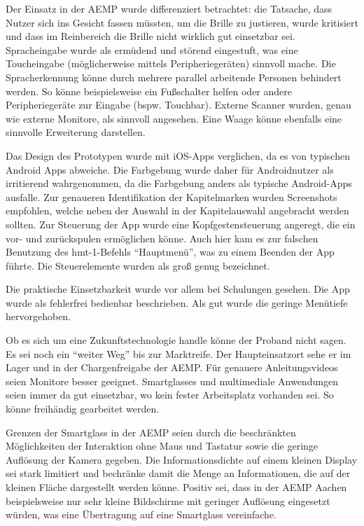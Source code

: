 Der Einsatz in der AEMP wurde differenziert betrachtet: die Tatsache, dass Nutzer sich ins Gesicht fassen müssten, um die Brille zu justieren, wurde kritisiert und dass im Reinbereich die Brille nicht wirklich gut einsetzbar sei. Spracheingabe wurde als ermüdend und störend eingestuft, was eine Toucheingabe (möglicherweise mittels Peripheriegeräten) sinnvoll mache. 
Die Spracherkennung könne durch mehrere parallel arbeitende Personen behindert werden. So könne beispielsweise ein Fußschalter helfen oder andere Peripheriegeräte zur Eingabe (bspw. Touchbar). Externe Scanner wurden, genau wie externe Monitore, als sinnvoll angesehen. Eine Waage könne ebenfalls eine sinnvolle Erweiterung darstellen.

Das Design des Prototypen wurde mit iOS-Apps verglichen, da es von typischen Android Apps abweiche. Die Farbgebung wurde daher für Androidnutzer als irritierend wahrgenommen, da die Farbgebung anders als typische Android-Apps ausfalle. Zur genaueren Identifikation der Kapitelmarken wurden Screenshots empfohlen, welche neben der Auswahl in der Kapitelauswahl angebracht werden sollten. Zur Steuerung der App wurde eine Kopfgestensteuerung angeregt, die ein vor- und zurückspulen ermöglichen könne. Auch hier kam es zur falschen Benutzung des hmt-1-Befehls \enquote{Hauptmenü}, was zu einem Beenden der App führte. Die Steuerelemente wurden als groß genug bezeichnet.

Die praktische Einsetzbarkeit wurde vor allem bei Schulungen gesehen. Die App wurde als fehlerfrei bedienbar beschrieben. Als gut wurde die geringe Menütiefe hervorgehoben.

Ob es sich um eine Zukunftstechnologie handle könne der Proband nicht sagen. Es sei noch ein \enquote{weiter Weg} bis zur Marktreife. Der Haupteinsatzort sehe er im Lager und in der Chargenfreigabe der AEMP. Für genauere Anleitungsvideos seien Monitore besser geeignet. Smartglasses und multimediale Anwendungen seien immer da gut einsetzbar, wo kein fester Arbeitsplatz vorhanden sei. So könne freihändig gearbeitet werden.

Grenzen der Smartglass in der AEMP seien durch die beschränkten Möglichkeiten der Interaktion ohne Maus und Tastatur sowie die geringe Auflösung der Kamera gegeben. Die Informationsdichte auf einem kleinen Display sei stark limitiert und bechränke damit die Menge an Informationen, die auf der kleinen Fläche dargestellt werden könne. Positiv sei, dass in der AEMP Aachen beispielsweise nur sehr kleine Bildschirme mit geringer Auflösung eingesetzt würden, was eine Übertragung auf eine Smartglass vereinfache.

